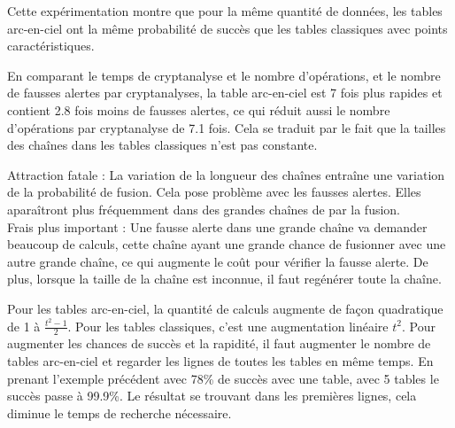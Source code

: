 	Cette expérimentation montre que pour la même quantité de données, les tables arc-en-ciel ont la même probabilité de succès que les tables classiques avec points caractéristiques.

	En comparant le temps de cryptanalyse et le nombre d'opérations, et le nombre de fausses alertes par cryptanalyses, la table arc-en-ciel est 7 fois plus rapides et contient 2.8 fois moins de fausses alertes, ce qui réduit aussi le nombre d'opérations par cryptanalyse de 7.1 fois. Cela se traduit par le fait que la tailles des chaînes dans les tables classiques n'est pas constante.


	Attraction fatale : La variation de la longueur des chaînes entraîne une variation de la probabilité de fusion. Cela pose problème avec les fausses alertes. Elles aparaîtront plus fréquemment dans des grandes chaînes de par la fusion.\\

	Frais plus important : Une fausse alerte dans une grande chaîne va demander beaucoup de calculs, cette chaîne ayant une grande chance de fusionner avec une autre grande chaîne, ce qui augmente le coût pour vérifier la fausse alerte. De plus, lorsque la taille de la chaîne est inconnue, il faut regénérer toute la chaîne.


	Pour les tables arc-en-ciel, la quantité de calculs augmente de façon quadratique de 1 à $\frac{t^2-1}{2}$. Pour les tables classiques, c'est une augmentation linéaire $t^2$. Pour augmenter les chances de succès et la rapidité, il faut augmenter le nombre de tables arc-en-ciel et regarder les lignes de toutes les tables en même temps. En prenant l'exemple précédent avec 78\% de succès avec une table, avec 5 tables le succès passe à 99.9\%. Le résultat se trouvant dans les premières lignes, cela diminue le temps de recherche nécessaire.

\endinput{}
